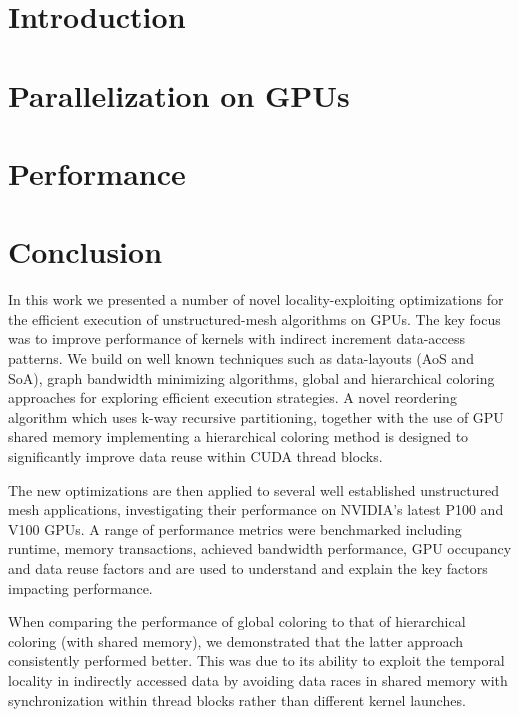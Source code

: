 \documentclass[number]{elsarticle}
\begin{document}
\section{Introduction}\label{introduction}



\section{Parallelization on GPUs}\label{parallelisation-on-gpu}



\section{Performance}\label{performance}




\section{Conclusion}\label{conclusion}

\noindent In this work we presented a number of novel locality-exploiting 
optimizations for the efficient execution of unstructured-mesh algorithms on 
GPUs. The key focus was to improve performance of kernels with indirect 
increment data-access patterns. We build on well known techniques such as 
data-layouts (AoS and SoA), graph bandwidth minimizing algorithms, global and 
hierarchical coloring approaches for exploring efficient execution strategies. 
A novel reordering algorithm which uses k-way recursive partitioning, together 
with the use of GPU shared memory implementing a hierarchical coloring method is 
designed to significantly improve data reuse within CUDA thread blocks.

The new optimizations are then applied to several well established unstructured
mesh applications, investigating their performance on NVIDIA’s latest P100
and V100 GPUs. A range of performance metrics were benchmarked including 
runtime, memory transactions, achieved bandwidth performance, GPU occupancy and 
data reuse factors and are used to understand and explain the key factors 
impacting performance.

When comparing the performance of global coloring to that of hierarchical 
coloring (with shared memory), we demonstrated that the latter approach 
consistently performed better. This was due to its ability to exploit the 
temporal locality in indirectly accessed data by avoiding data races in shared 
memory with synchronization within thread blocks rather than different kernel 
launches.
\end{document}
